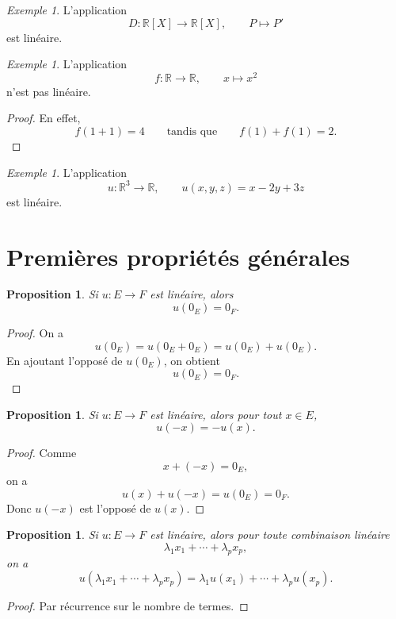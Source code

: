 \documentclass[11pt,a4paper]{article}
\newtheorem{proposition}[definition]{Proposition}
\theoremstyle{remark}
\newtheorem{exemple}[definition]{Exemple}
\newcommand{\R}{\mathbb{R}}
\begin{document}
\begin{exemple}
L’application
\[
D:\R[X]\to\R[X],\qquad P\mapsto P'
\]
est linéaire.
\end{exemple}

\begin{exemple}
L’application
\[
f:\R\to\R,\qquad x\mapsto x^2
\]
n’est pas linéaire.
\end{exemple}

\begin{proof}
En effet,
\[
f(1+1)=4
\qquad \text{tandis que} \qquad
f(1)+f(1)=2.
\]
\end{proof}

\begin{exemple}
L’application
\[
u:\R^3\to\R,\qquad u(x,y,z)=x-2y+3z
\]
est linéaire.
\end{exemple}

\section{Premières propriétés générales}

\begin{proposition}
Si \(u:E\to F\) est linéaire, alors
\[
u(0_E)=0_F.
\]
\end{proposition}

\begin{proof}
On a
\[
u(0_E)=u(0_E+0_E)=u(0_E)+u(0_E).
\]
En ajoutant l’opposé de \(u(0_E)\), on obtient
\[
u(0_E)=0_F.
\]
\end{proof}

\begin{proposition}
Si \(u:E\to F\) est linéaire, alors pour tout \(x\in E\),
\[
u(-x)=-u(x).
\]
\end{proposition}

\begin{proof}
Comme
\[
x+(-x)=0_E,
\]
on a
\[
u(x)+u(-x)=u(0_E)=0_F.
\]
Donc \(u(-x)\) est l’opposé de \(u(x)\).
\end{proof}

\begin{proposition}
Si \(u:E\to F\) est linéaire, alors pour toute combinaison linéaire
\[
\lambda_1x_1+\cdots+\lambda_px_p,
\]
on a
\[
u(\lambda_1x_1+\cdots+\lambda_px_p)
=
\lambda_1u(x_1)+\cdots+\lambda_pu(x_p).
\]
\end{proposition}

\begin{proof}
Par récurrence sur le nombre de termes.
\end{proof}
\end{document}
